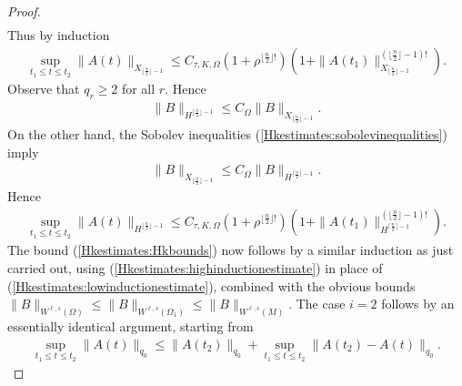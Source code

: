 \documentclass[12pt]{amsart}
\renewcommand{\1}{{\mathbf 1}}
\theoremstyle{others}
\numberwithin{equation}{section}
\begin{document}
\begin{proof}
\begin{align*}
    \end{align*} Thus by induction
    \begin{align*}
        \sup_{t_1 \leq t \leq t_2} \|A(t)\|_{X_{\lfloor\frac{n}{2}\rfloor-1}} \leq C_{\tau, K, \Omega} \left(1 + \rho^{\lfloor\frac{n}{2}\rfloor!} \right) \left(1 + \|A(t_1)\|_{X_{\lfloor\frac{n}{2}\rfloor-1}}^{(\lfloor\frac{n}{2}\rfloor-1)!} \right).
    \end{align*} Observe that \(q_r \geq 2\) for all \(r\). Hence
    \begin{align*}
        \|B\|_{H^{\lfloor\frac{n}{2}\rfloor-1}} \leq C_\Omega \|B\|_{X_{\lfloor\frac{n}{2}\rfloor-1}}.
    \end{align*} On the other hand, the Sobolev inequalities (\ref{Hkestimates:sobolevinequalities}) imply
    \begin{align*}
        \|B\|_{X_{\lfloor\frac{n}{2}\rfloor-1}} \leq C_\Omega \|B\|_{H^{\lceil\frac{n}{2}\rceil-1}}.
    \end{align*} Hence
    \begin{align*}
        \sup_{t_1 \leq t \leq t_2} \|A(t)\|_{H^{\lfloor\frac{n}{2}\rfloor-1}} \leq C_{\tau, K, \Omega} \left(1+\rho^{\lfloor\frac{n}{2}
    \rfloor!} \right) \left(1 + \|A(t_1)\|_{H^{\lceil\frac{n}{2}\rceil-1}}^{(\lfloor\frac{n}{2}\rfloor-1)!} \right).
    \end{align*} The bound (\ref{Hkestimates:Hkbounds}) now follows by a similar induction as just carried out, using (\ref{Hkestimates:highinductionestimate}) in place of (\ref{Hkestimates:lowinductionestimate}), combined with the obvious bounds \(\|B\|_{W^{\ell, s}(\Omega)} \leq \|B\|_{W^{\ell, s}(\Omega_1)} \leq \|B\|_{W^{\ell, s}(M)}\). The case \(i = 2\) follows by an essentially identical argument, starting from
    \begin{align*}
        \sup_{t_1 \leq t \leq t_2} \|A(t)\|_{q_0} \leq \|A(t_2)\|_{q_0} + \sup_{t_1 \leq t \leq t_2} \|A(t_2) - A(t)\|_{q_0}.
    \end{align*}
\end{proof}
\end{document}
